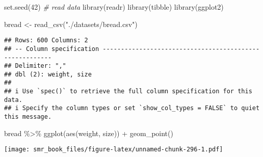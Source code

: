 \documentclass[
  oneside]{book}
\newenvironment{Shaded}{\begin{snugshade}}{\end{snugshade}}
\newcommand{\CommentTok}[1]{\textcolor[rgb]{0.56,0.35,0.01}{\textit{#1}}}
\newcommand{\DecValTok}[1]{\textcolor[rgb]{0.00,0.00,0.81}{#1}}
\newcommand{\FunctionTok}[1]{\textcolor[rgb]{0.00,0.00,0.00}{#1}}
\newcommand{\NormalTok}[1]{#1}
\newcommand{\OtherTok}[1]{\textcolor[rgb]{0.56,0.35,0.01}{#1}}
\newcommand{\SpecialCharTok}[1]{\textcolor[rgb]{0.00,0.00,0.00}{#1}}
\newcommand{\StringTok}[1]{\textcolor[rgb]{0.31,0.60,0.02}{#1}}
\begin{document}
\begin{Shaded}
\begin{Highlighting}[]
\FunctionTok{set.seed}\NormalTok{(}\DecValTok{42}\NormalTok{)}
\CommentTok{\# read data}
\FunctionTok{library}\NormalTok{(readr)}
\FunctionTok{library}\NormalTok{(tibble)}
\FunctionTok{library}\NormalTok{(ggplot2)}

\NormalTok{bread }\OtherTok{\textless{}{-}} \FunctionTok{read\_csv}\NormalTok{(}\StringTok{"./datasets/bread.csv"}\NormalTok{)}
\end{Highlighting}
\end{Shaded}

\begin{verbatim}
## Rows: 600 Columns: 2
## -- Column specification --------------------------------------------------------
## Delimiter: ","
## dbl (2): weight, size
## 
## i Use `spec()` to retrieve the full column specification for this data.
## i Specify the column types or set `show_col_types = FALSE` to quiet this message.
\end{verbatim}

\begin{Shaded}
\begin{Highlighting}[]
\NormalTok{bread }\SpecialCharTok{\%\textgreater{}\%}
  \FunctionTok{ggplot}\NormalTok{(}\FunctionTok{aes}\NormalTok{(weight, size)) }\SpecialCharTok{+}
  \FunctionTok{geom\_point}\NormalTok{()}
\end{Highlighting}
\end{Shaded}

\texttt{[image: smr\_book\_files/figure-latex/unnamed-chunk-296-1.pdf]}
\end{document}

